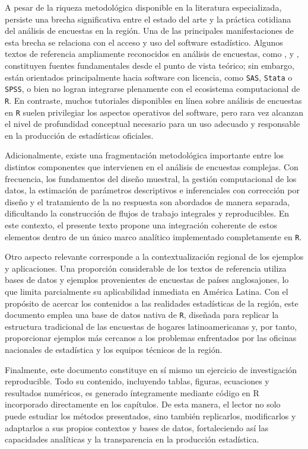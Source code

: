 \documentclass[
  spanish,
  12pt,
]{book}
\begin{document}
A pesar de la riqueza metodológica disponible en la literatura especializada, persiste una brecha significativa entre el estado del arte y la práctica cotidiana del análisis de encuestas en la región. Una de las principales manifestaciones de esta brecha se relaciona con el acceso y uso del software estadístico. Algunos textos de referencia ampliamente reconocidos en análisis de encuestas, como \citet{heeringa2017applied}, \citet{cochran1977sampling} y \citet{sarndal2003model}, constituyen fuentes fundamentales desde el punto de vista teórico; sin embargo, están orientados principalmente hacia software con licencia, como \texttt{SAS}, \texttt{Stata} o \texttt{SPSS}, o bien no logran integrarse plenamente con el ecosistema computacional de \texttt{R}. En contraste, muchos tutoriales disponibles en línea sobre análisis de encuestas en \texttt{R} suelen privilegiar los aspectos operativos del software, pero rara vez alcanzan el nivel de profundidad conceptual necesario para un uso adecuado y responsable en la producción de estadísticas oficiales.

Adicionalmente, existe una fragmentación metodológica importante entre los distintos componentes que intervienen en el análisis de encuestas complejas. Con frecuencia, los fundamentos del diseño muestral, la gestión computacional de los datos, la estimación de parámetros descriptivos e inferenciales con corrección por diseño y el tratamiento de la no respuesta son abordados de manera separada, dificultando la construcción de flujos de trabajo integrales y reproducibles. En este contexto, el presente texto propone una integración coherente de estos elementos dentro de un único marco analítico implementado completamente en \texttt{R}.

Otro aspecto relevante corresponde a la contextualización regional de los ejemplos y aplicaciones. Una proporción considerable de los textos de referencia utiliza bases de datos y ejemplos provenientes de encuestas de países anglosajones, lo que limita parcialmente su aplicabilidad inmediata en América Latina. Con el propósito de acercar los contenidos a las realidades estadísticas de la región, este documento emplea una base de datos nativa de \texttt{R}, diseñada para replicar la estructura tradicional de las encuestas de hogares latinoamericanas y, por tanto, proporcionar ejemplos más cercanos a los problemas enfrentados por las oficinas nacionales de estadística y los equipos técnicos de la región.

Finalmente, este documento constituye en sí mismo un ejercicio de investigación reproducible. Todo su contenido, incluyendo tablas, figuras, ecuaciones y resultados numéricos, es generado íntegramente mediante código en R incorporado directamente en los capítulos. De esta manera, el lector no solo puede estudiar los métodos presentados, sino también replicarlos, modificarlos y adaptarlos a sus propios contextos y bases de datos, fortaleciendo así las capacidades analíticas y la transparencia en la producción estadística.
\end{document}
